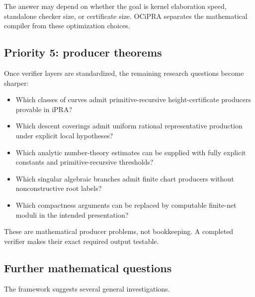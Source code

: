 The answer may depend on whether the goal is kernel elaboration speed, standalone checker size, or certificate size.  OCiPRA separates the mathematical compiler from these optimization choices.

\subsection{Priority 5: producer theorems}

Once verifier layers are standardized, the remaining research questions become sharper:

\begin{itemize}
  \item Which classes of curves admit primitive-recursive height-certificate producers provable in iPRA?
  \item Which descent coverings admit uniform rational representative production under explicit local hypotheses?
  \item Which analytic number-theory estimates can be supplied with fully explicit constants and primitive-recursive thresholds?
  \item Which singular algebraic branches admit finite chart producers without nonconstructive root labels?
  \item Which compactness arguments can be replaced by computable finite-net moduli in the intended presentation?
\end{itemize}

These are mathematical producer problems, not bookkeeping.  A completed verifier makes their exact required output testable.

\subsection{Further mathematical questions}

The framework suggests several general investigations.

